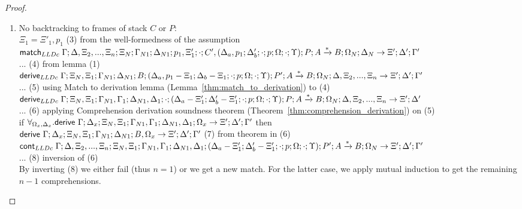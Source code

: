 \begin{proof}
\begin{itemize}
   \begin{enumerate}
      \item No backtracking to frames of stack $C$ or $P$:\\
      {\footnotesize 
      $\Xi_1 = \Xi'_1, p_1$ \hfill (3) from the well-formedness of the assumption \\
      $\mathsf{match}_{LLDc} \; \Gamma; \Delta, \Xi_2, ..., \Xi_n; \Xi_N; \Gamma_{N1}; \Delta_{N1}; p_1, \Xi'_1; \cdot; C', (\Delta_a, p_1; \Delta'_b; \cdot; p; \Omega; \cdot; \Upsilon); P; A \xrightarrow{*} B; \Omega_N; \Delta_N \rightarrow \Xi'; \Delta'; \Gamma'$ \\ ... \hfill (4) from lemma (1) \\
      $\mathsf{derive}_{LLDc} \; \Gamma; \Xi_N, \Xi_1; \Gamma_{N1}; \Delta_{N1}; B; (\Delta_a, p_1 - \Xi_1; \Delta_b - \Xi_1; \cdot; p; \Omega; \cdot; \Upsilon); P'; A \xrightarrow{*} B; \Omega_N; \Delta, \Xi_2, ..., \Xi_n \rightarrow \Xi'; \Delta'; \Gamma'$ \\ ... \hfill (5) using Match to derivation lemma (Lemma~\ref{thm:match_to_derivation}) to (4) \\
      $\mathsf{derive}_{LLDc} \; \Gamma; \Xi_N, \Xi_1; \Gamma_{N1}, \Gamma_1; \Delta_{N1}, \Delta_1; \cdot; (\Delta_a - \Xi'_1; \Delta'_b - \Xi'_1; \cdot; p; \Omega; \cdot; \Upsilon); P; A \xrightarrow{*} B; \Omega_N; \Delta, \Xi_2, ..., \Xi_n \rightarrow \Xi'; \Delta'$ \\ ... \hfill (6) applying Comprehension derivation soundness theorem (Theorem~\ref{thm:comprehension_derivation}) on (5) \\
      if $\forall_{\Omega_x, \Delta_x}. \mathsf{derive}~ \Gamma; \Delta_x; \Xi_N, \Xi_1; \Gamma_{N1}, \Gamma_1; \Delta_{N1}, \Delta_1; \Omega_x \rightarrow \Xi'; \Delta'; \Gamma'$ then \\ \hspace*{0.5cm} $\mathsf{derive}~ \Gamma; \Delta_x; \Xi_N, \Xi_1; \Gamma_{N1}; \Delta_{N1}; B, \Omega_x \rightarrow \Xi'; \Delta'; \Gamma'$ \hfill (7) from theorem in (6) \\
      $\mathsf{cont}_{LLDc} \; \Gamma; \Delta, \Xi_2, ..., \Xi_n; \Xi_N, \Xi_1; \Gamma_{N1}, \Gamma_1; \Delta_{N1}, \Delta_1; (\Delta_a - \Xi'_1; \Delta'_b - \Xi'_1; \cdot; p; \Omega; \cdot; \Upsilon); P'; A \xrightarrow{*} B; \Omega_N \rightarrow \Xi'; \Delta'; \Gamma'$ \\... \hfill (8) inversion of (6) \\
        
        By inverting (8) we either fail (thus $n = 1$) or we get a new match. For the latter case, we apply mutual induction to get the remaining $n - 1$ comprehensions.\\
      }
      

\end{enumerate}
\end{itemize}
\end{proof}
